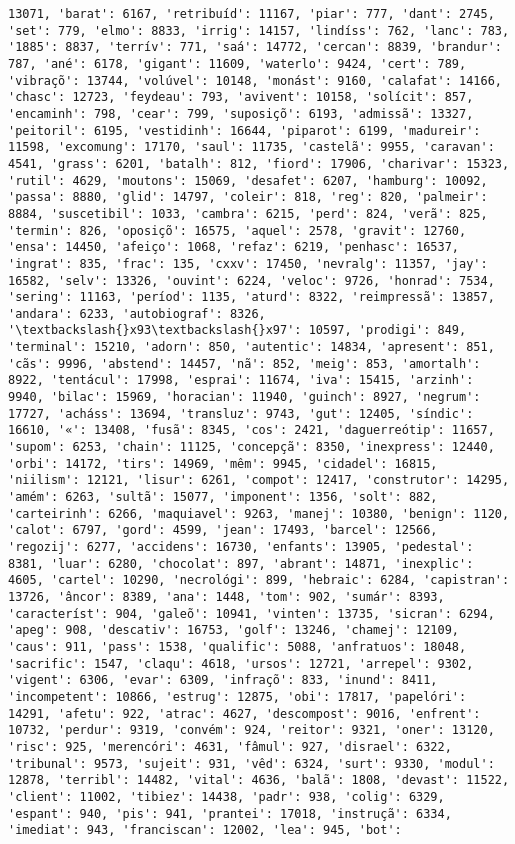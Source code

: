 \begin{Verbatim}[commandchars=\\\{\}]
13071, 'barat': 6167, 'retribuíd': 11167, 'piar': 777, 'dant': 2745, 'set': 779, 'elmo': 8833, 'irrig': 14157, 'lindíss': 762, 'lanc': 783, '1885': 8837, 'terrív': 771, 'saá': 14772, 'cercan': 8839, 'brandur': 787, 'ané': 6178, 'gigant': 11609, 'waterlo': 9424, 'cert': 789, 'vibraçõ': 13744, 'volúvel': 10148, 'monást': 9160, 'calafat': 14166, 'chasc': 12723, 'feydeau': 793, 'avivent': 10158, 'solícit': 857, 'encaminh': 798, 'cear': 799, 'suposiçõ': 6193, 'admissã': 13327, 'peitoril': 6195, 'vestidinh': 16644, 'piparot': 6199, 'madureir': 11598, 'excomung': 17170, 'saul': 11735, 'castelã': 9955, 'caravan': 4541, 'grass': 6201, 'batalh': 812, 'fiord': 17906, 'charivar': 15323, 'rutil': 4629, 'moutons': 15069, 'desafet': 6207, 'hamburg': 10092, 'passa': 8880, 'glid': 14797, 'coleir': 818, 'reg': 820, 'palmeir': 8884, 'suscetibil': 1033, 'cambra': 6215, 'perd': 824, 'verã': 825, 'termin': 826, 'oposiçõ': 16575, 'aquel': 2578, 'gravit': 12760, 'ensa': 14450, 'afeiço': 1068, 'refaz': 6219, 'penhasc': 16537, 'ingrat': 835, 'frac': 135, 'cxxv': 17450, 'nevralg': 11357, 'jay': 16582, 'selv': 13326, 'ouvint': 6224, 'veloc': 9726, 'honrad': 7534, 'sering': 11163, 'períod': 1135, 'aturd': 8322, 'reimpressã': 13857, 'andara': 6233, 'autobiograf': 8326, '\textbackslash{}x93\textbackslash{}x97': 10597, 'prodigi': 849, 'terminal': 15210, 'adorn': 850, 'autentic': 14834, 'apresent': 851, 'cãs': 9996, 'abstend': 14457, 'nã': 852, 'meig': 853, 'amortalh': 8922, 'tentácul': 17998, 'esprai': 11674, 'iva': 15415, 'arzinh': 9940, 'bilac': 15969, 'horacian': 11940, 'guinch': 8927, 'negrum': 17727, 'acháss': 13694, 'transluz': 9743, 'gut': 12405, 'síndic': 16610, '«': 13408, 'fusã': 8345, 'cos': 2421, 'daguerreótip': 11657, 'supom': 6253, 'chain': 11125, 'concepçã': 8350, 'inexpress': 12440, 'orbi': 14172, 'tirs': 14969, 'mêm': 9945, 'cidadel': 16815, 'niilism': 12121, 'lisur': 6261, 'compot': 12417, 'construtor': 14295, 'amém': 6263, 'sultã': 15077, 'imponent': 1356, 'solt': 882, 'carteirinh': 6266, 'maquiavel': 9263, 'manej': 10380, 'benign': 1120, 'calot': 6797, 'gord': 4599, 'jean': 17493, 'barcel': 12566, 'regozij': 6277, 'accidens': 16730, 'enfants': 13905, 'pedestal': 8381, 'luar': 6280, 'chocolat': 897, 'abrant': 14871, 'inexplic': 4605, 'cartel': 10290, 'necrológi': 899, 'hebraic': 6284, 'capistran': 13726, 'âncor': 8389, 'ana': 1448, 'tom': 902, 'sumár': 8393, 'característ': 904, 'galeõ': 10941, 'vinten': 13735, 'sicran': 6294, 'apeg': 908, 'descativ': 16753, 'golf': 13246, 'chamej': 12109, 'caus': 911, 'pass': 1538, 'qualific': 5088, 'anfratuos': 18048, 'sacrific': 1547, 'claqu': 4618, 'ursos': 12721, 'arrepel': 9302, 'vigent': 6306, 'evar': 6309, 'infraçõ': 833, 'inund': 8411, 'incompetent': 10866, 'estrug': 12875, 'obi': 17817, 'papelóri': 14291, 'afetu': 922, 'atrac': 4627, 'descompost': 9016, 'enfrent': 10732, 'perdur': 9319, 'convém': 924, 'reitor': 9321, 'oner': 13120, 'risc': 925, 'merencóri': 4631, 'fâmul': 927, 'disrael': 6322, 'tribunal': 9573, 'sujeit': 931, 'vêd': 6324, 'surt': 9330, 'modul': 12878, 'terribl': 14482, 'vital': 4636, 'balã': 1808, 'devast': 11522, 'client': 11002, 'tibiez': 14438, 'padr': 938, 'colig': 6329, 'espant': 940, 'pis': 941, 'prantei': 17018, 'instruçã': 6334, 'imediat': 943, 'franciscan': 12002, 'lea': 945, 'bot': 
\end{Verbatim}
